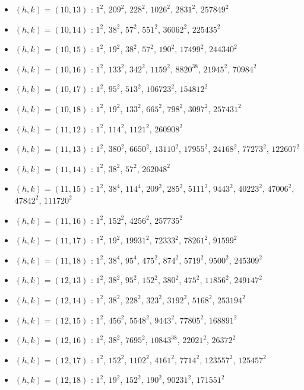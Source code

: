 \begin{itemize}
\item $(h,k)=(10,13)$ : $1^{2}$, $209^{2}$, $228^{2}$, $1026^{2}$, $2831^{2}$, $257849^{2}$
\item $(h,k)=(10,14)$ : $1^{2}$, $38^{2}$, $57^{2}$, $551^{2}$, $36062^{2}$, $225435^{2}$
\item $(h,k)=(10,15)$ : $1^{2}$, $19^{2}$, $38^{2}$, $57^{2}$, $190^{2}$, $17499^{2}$, $244340^{2}$
\item $(h,k)=(10,16)$ : $1^{2}$, $133^{2}$, $342^{2}$, $1159^{2}$, $8820^{38}$, $21945^{2}$, $70984^{2}$
\item $(h,k)=(10,17)$ : $1^{2}$, $95^{2}$, $513^{2}$, $106723^{2}$, $154812^{2}$
\item $(h,k)=(10,18)$ : $1^{2}$, $19^{2}$, $133^{2}$, $665^{2}$, $798^{2}$, $3097^{2}$, $257431^{2}$
\item $(h,k)=(11,12)$ : $1^{2}$, $114^{2}$, $1121^{2}$, $260908^{2}$
\item $(h,k)=(11,13)$ : $1^{2}$, $380^{2}$, $6650^{2}$, $13110^{2}$, $17955^{2}$, $24168^{2}$, $77273^{2}$, $122607^{2}$
\item $(h,k)=(11,14)$ : $1^{2}$, $38^{2}$, $57^{2}$, $262048^{2}$
\item $(h,k)=(11,15)$ : $1^{2}$, $38^{4}$, $114^{4}$, $209^{2}$, $285^{2}$, $5111^{2}$, $9443^{2}$, $40223^{2}$, $47006^{2}$, $47842^{2}$, $111720^{2}$
\item $(h,k)=(11,16)$ : $1^{2}$, $152^{2}$, $4256^{2}$, $257735^{2}$
\item $(h,k)=(11,17)$ : $1^{2}$, $19^{2}$, $19931^{2}$, $72333^{2}$, $78261^{2}$, $91599^{2}$
\item $(h,k)=(11,18)$ : $1^{2}$, $38^{4}$, $95^{4}$, $475^{2}$, $874^{2}$, $5719^{2}$, $9500^{2}$, $245309^{2}$
\item $(h,k)=(12,13)$ : $1^{2}$, $38^{2}$, $95^{2}$, $152^{2}$, $380^{2}$, $475^{2}$, $11856^{2}$, $249147^{2}$
\item $(h,k)=(12,14)$ : $1^{2}$, $38^{2}$, $228^{2}$, $323^{2}$, $3192^{2}$, $5168^{2}$, $253194^{2}$
\item $(h,k)=(12,15)$ : $1^{2}$, $456^{2}$, $5548^{2}$, $9443^{2}$, $77805^{2}$, $168891^{2}$
\item $(h,k)=(12,16)$ : $1^{2}$, $38^{2}$, $7695^{2}$, $10843^{38}$, $22021^{2}$, $26372^{2}$
\item $(h,k)=(12,17)$ : $1^{2}$, $152^{2}$, $1102^{2}$, $4161^{2}$, $7714^{2}$, $123557^{2}$, $125457^{2}$
\item $(h,k)=(12,18)$ : $1^{2}$, $19^{2}$, $152^{2}$, $190^{2}$, $90231^{2}$, $171551^{2}$

\end{itemize}
